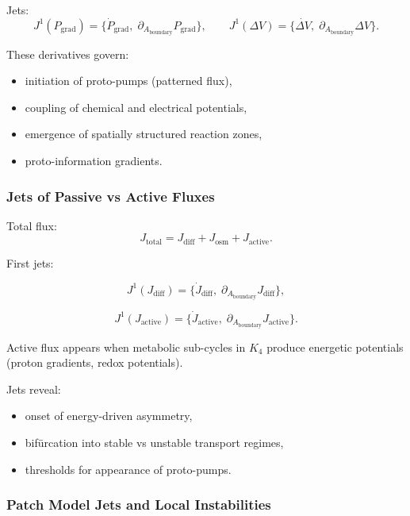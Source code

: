 Jets:
\[
J^1(P_{\mathrm{grad}})=
\{\dot{P}_{\mathrm{grad}},\;\partial_{A_{\mathrm{boundary}}}P_{\mathrm{grad}}\},
\qquad
J^1(\Delta V)=
\{\dot{\Delta V},\;\partial_{A_{\mathrm{boundary}}}\Delta V\}.
\]

These derivatives govern:

\begin{itemize}
    \item initiation of proto-pumps (patterned flux),
    \item coupling of chemical and electrical potentials,
    \item emergence of spatially structured reaction zones,
    \item proto-information gradients.
\end{itemize}


\subsubsection{Jets of Passive vs Active Fluxes}

Total flux:
\[
J_{\mathrm{total}}
=
J_{\mathrm{diff}} + J_{\mathrm{osm}} + J_{\mathrm{active}}.
\]

First jets:

\[
J^1(J_{\mathrm{diff}})=
\{\dot{J}_{\mathrm{diff}},\;\partial_{A_{\mathrm{boundary}}}J_{\mathrm{diff}}\},
\]

\[
J^1(J_{\mathrm{active}})=
\{\dot{J}_{\mathrm{active}},\;\partial_{A_{\mathrm{boundary}}}J_{\mathrm{active}}\}.
\]

Active flux appears when metabolic sub-cycles in $K_4$ produce energetic
potentials (proton gradients, redox potentials).

Jets reveal:

\begin{itemize}
    \item onset of energy-driven asymmetry,
    \item bifürcation into stable vs unstable transport regimes,
    \item thresholds for appearance of proto-pumps.
\end{itemize}


\subsubsection{Patch Model Jets and Local Instabilities}

